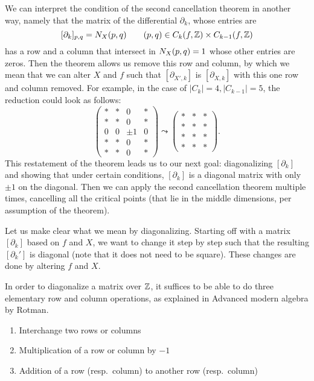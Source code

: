 We can interpret the condition of the second cancellation theorem in another way, namely that the matrix of the differential $\partial_k$, whose entries are \[
    [\partial_k]_{p, q} = N_{X}(p, q) \qquad (p,q) \in C_k(f, \mathbb{Z}) \times  C_{k-1}(f, \mathbb{Z})
\] has a row and a column that intersect in $N_{X}(p, q) = 1$ whose other entries are zeros. Then the theorem allows us remove this row and column, by which we mean that we can alter $X$ and $f$ such that $[\partial_{X', k}]$ is $[\partial_{X, k}]$ with this one row and column removed.
For example, in the case of $|C_k| = 4, |C_{k-1}| = 5$, the reduction could look as follows:
\[
    \begin{pmatrix}
        * & *&0 & *\\
        * & *&0 & *\\
        0 & 0&\pm 1 & 0 \\
        * & *&0 & *\\
        * & *&0 & *
    \end{pmatrix}
\leadsto
\begin{pmatrix}
    * & *& *\\
    * & *& *\\
    * & *& *\\
    * & *& *
\end{pmatrix}
.\] 
This restatement of the theorem leads us to our next goal: diagonalizing $[\partial_k]$ and showing that under certain conditions,  $[\partial_k]$ is a diagonal matrix with only $\pm 1$ on the diagonal. Then we can apply the second cancellation theorem multiple times, cancelling all the critical points (that lie in the middle dimensions, per assumption of the theorem).

Let us make clear what we mean by diagonalizing.
Starting off with a matrix $[\partial_k]$ based on $f$ and $X$, we want to change it step by step such that the resulting $[\partial_k']$ is diagonal (note that it does not need to be square). These changes are done by altering $f$ and $X$.

In order to diagonalize a matrix over $\mathbb{Z}$, it suffices to be able to do three elementary row and column operations, as explained in Advanced modern algebra by Rotman.
\begin{samepage}
\begin{enumerate}[E1]
    \item Interchange two rows or columns
    \item Multiplication of a row or column by $-1$
    \item Addition of a row (resp.~column) to another row (resp.~column)
\end{enumerate}
\end{samepage}

